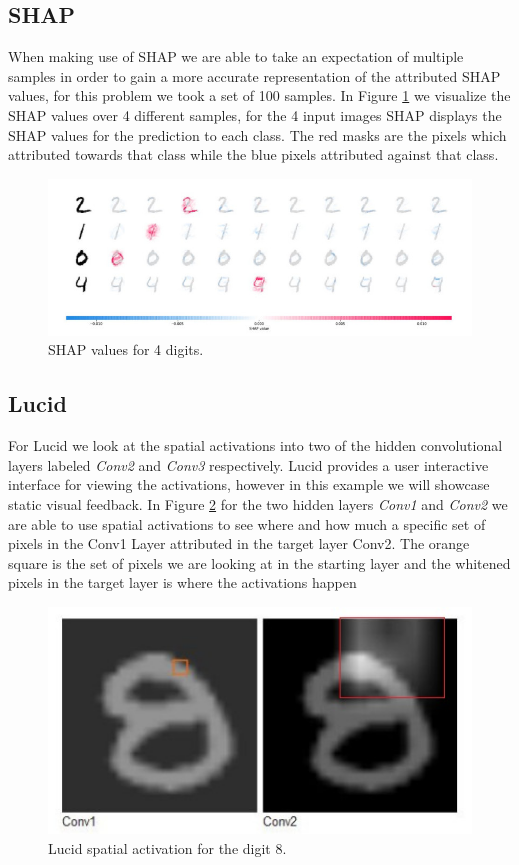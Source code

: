 \subsection{SHAP}
When making use of SHAP we are able to take an expectation of multiple samples in order to gain a more accurate representation of the attributed SHAP values, for this problem we took a set of 100 samples. In Figure \ref{fig:shap-mnist} we visualize the SHAP values over 4 different samples, for the 4 input images SHAP displays the SHAP values for the prediction to each class. The red masks are the pixels which attributed towards that class while the blue pixels attributed against that class.
\begin  {figure}[!htpb]
  \includegraphics[width=\linewidth]{Evaluation_Images/Shap_mnist.jpg}
  \caption{SHAP values for 4 digits.}
  \label{fig:shap-mnist}
\end{figure}

\subsection{Lucid}
For Lucid we look at the spatial activations into two of the hidden convolutional layers labeled \emph{Conv2} and \emph{Conv3} respectively. Lucid provides a user interactive interface for viewing the activations, however in this example we will showcase static visual feedback. In Figure \ref{fig:lucid-mnist} for the two hidden layers \emph{Conv1} and \emph{Conv2} we are able to use spatial activations to see where and how much a specific set of pixels in the Conv1 Layer attributed in the target layer Conv2. The orange square is the set of pixels we are looking at in the starting layer and the whitened pixels in the target layer is where the activations happen

\begin  {figure}[!htpb]
  \includegraphics[width=\linewidth]{Evaluation_Images/Lucid_mnist.jpg}
  \caption{Lucid spatial activation for the digit 8.}
  \label{fig:lucid-mnist}
\end{figure} 

